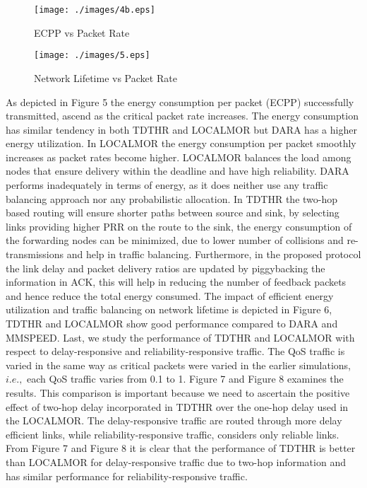 \documentclass[fleqn,twoside]{article}
\begin{document}
\begin{figure}
\centering
\texttt{[image: ./images/4b.eps]}
\caption{ECPP vs Packet Rate}
\end{figure}

\begin{figure}
\centering
\texttt{[image: ./images/5.eps]}
\caption{Network Lifetime vs Packet Rate}
\end{figure}
\vskip 2mm
As depicted in Figure 5 the energy consumption per packet (ECPP) successfully transmitted, ascend as the 
critical packet rate increases.
The energy consumption has similar tendency in both TDTHR and LOCALMOR but DARA has a higher energy utilization. 
In LOCALMOR the energy consumption per packet smoothly increases as packet rates become higher.
LOCALMOR balances the load among nodes that ensure delivery within the deadline and have high reliability.
DARA performs inadequately in terms of energy, as it does neither use any traffic balancing approach nor any probabilistic
allocation. 
\vskip 2mm
In TDTHR the two-hop based routing will ensure shorter paths between source and sink, by selecting links providing 
higher PRR on the route to the sink, the energy consumption of the forwarding nodes can be 
minimized, due to lower number of collisions and re-transmissions and help in traffic balancing. 
Furthermore, in the proposed protocol the link delay and 
packet delivery ratios are updated by piggybacking the information in ACK, this will help in reducing the number of feedback
packets and hence reduce the total energy consumed. The impact of efficient energy utilization and traffic balancing on network lifetime is depicted in Figure 6, TDTHR and LOCALMOR show good performance compared to DARA and MMSPEED.
\vskip 2mm
Last, we study the performance of TDTHR and LOCALMOR with respect to delay-responsive and reliability-responsive traffic.
The QoS traffic is varied in the same way as critical packets were varied in the earlier simulations, $i.e.,$ each QoS 
traffic varies from 0.1 to 1. Figure 7 and Figure 8 examines the results.
This comparison is important because we need to ascertain the positive effect of two-hop delay incorporated in TDTHR over
the one-hop delay used in the LOCALMOR. The delay-responsive traffic are routed through more delay efficient
links, while reliability-responsive traffic, considers only reliable links. From Figure 7 and Figure 8 it is clear that
the performance of TDTHR is better than LOCALMOR for delay-responsive traffic due to
two-hop information and has similar performance for reliability-responsive traffic.
\end{document}
